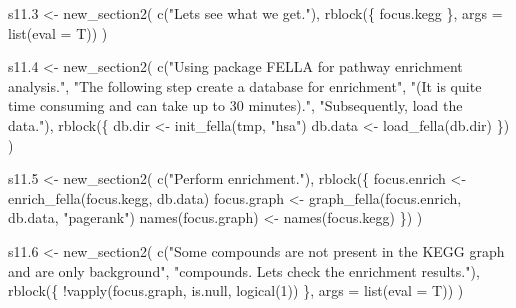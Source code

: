 \documentclass[
]{article}
\newenvironment{Shaded}{\begin{snugshade}}{\end{snugshade}}
\newcommand{\AttributeTok}[1]{\textcolor[rgb]{0.77,0.63,0.00}{#1}}
\newcommand{\DecValTok}[1]{\textcolor[rgb]{0.00,0.00,0.81}{#1}}
\newcommand{\FloatTok}[1]{\textcolor[rgb]{0.00,0.00,0.81}{#1}}
\newcommand{\FunctionTok}[1]{\textcolor[rgb]{0.00,0.00,0.00}{#1}}
\newcommand{\NormalTok}[1]{#1}
\newcommand{\OtherTok}[1]{\textcolor[rgb]{0.56,0.35,0.01}{#1}}
\newcommand{\SpecialCharTok}[1]{\textcolor[rgb]{0.00,0.00,0.00}{#1}}
\newcommand{\StringTok}[1]{\textcolor[rgb]{0.31,0.60,0.02}{#1}}
\begin{document}
\begin{Shaded}
\begin{Highlighting}[]
\NormalTok{s11}\FloatTok{.3} \OtherTok{\textless{}{-}} \FunctionTok{new\_section2}\NormalTok{(}
  \FunctionTok{c}\NormalTok{(}\StringTok{"Let\textquotesingle{}s see what we get."}\NormalTok{),}
  \FunctionTok{rblock}\NormalTok{(\{}
\NormalTok{    focus.kegg}
\NormalTok{  \}, }\AttributeTok{args =} \FunctionTok{list}\NormalTok{(}\AttributeTok{eval =}\NormalTok{ T))}
\NormalTok{)}

\NormalTok{s11}\FloatTok{.4} \OtherTok{\textless{}{-}} \FunctionTok{new\_section2}\NormalTok{(}
  \FunctionTok{c}\NormalTok{(}\StringTok{"Using package \textquotesingle{}FELLA\textquotesingle{} for pathway enrichment analysis."}\NormalTok{,}
    \StringTok{"The following step create a \textquotesingle{}database\textquotesingle{} for enrichment"}\NormalTok{,}
    \StringTok{"(It is quite time consuming and can take up to 30 minutes)."}\NormalTok{,}
    \StringTok{"Subsequently, load the data."}\NormalTok{),}
  \FunctionTok{rblock}\NormalTok{(\{}
\NormalTok{    db.dir }\OtherTok{\textless{}{-}} \FunctionTok{init\_fella}\NormalTok{(tmp, }\StringTok{"hsa"}\NormalTok{)}
\NormalTok{    db.data }\OtherTok{\textless{}{-}} \FunctionTok{load\_fella}\NormalTok{(db.dir)}
\NormalTok{  \})}
\NormalTok{)}

\NormalTok{s11}\FloatTok{.5} \OtherTok{\textless{}{-}} \FunctionTok{new\_section2}\NormalTok{(}
  \FunctionTok{c}\NormalTok{(}\StringTok{"Perform enrichment."}\NormalTok{),}
  \FunctionTok{rblock}\NormalTok{(\{}
\NormalTok{    focus.enrich }\OtherTok{\textless{}{-}} \FunctionTok{enrich\_fella}\NormalTok{(focus.kegg, db.data)}
\NormalTok{    focus.graph }\OtherTok{\textless{}{-}} \FunctionTok{graph\_fella}\NormalTok{(focus.enrich, db.data, }\StringTok{"pagerank"}\NormalTok{)}
    \FunctionTok{names}\NormalTok{(focus.graph) }\OtherTok{\textless{}{-}} \FunctionTok{names}\NormalTok{(focus.kegg)}
\NormalTok{  \})}
\NormalTok{)}

\NormalTok{s11}\FloatTok{.6} \OtherTok{\textless{}{-}} \FunctionTok{new\_section2}\NormalTok{(}
  \FunctionTok{c}\NormalTok{(}\StringTok{"Some compounds are not present in the KEGG graph and are only background"}\NormalTok{,}
    \StringTok{"compounds. Let\textquotesingle{}s check the enrichment results."}\NormalTok{),}
  \FunctionTok{rblock}\NormalTok{(\{}
    \SpecialCharTok{!}\FunctionTok{vapply}\NormalTok{(focus.graph, is.null, }\FunctionTok{logical}\NormalTok{(}\DecValTok{1}\NormalTok{))}
\NormalTok{  \}, }\AttributeTok{args =} \FunctionTok{list}\NormalTok{(}\AttributeTok{eval =}\NormalTok{ T))}
\NormalTok{)}


\end{Highlighting}
\end{Shaded}
\end{document}
